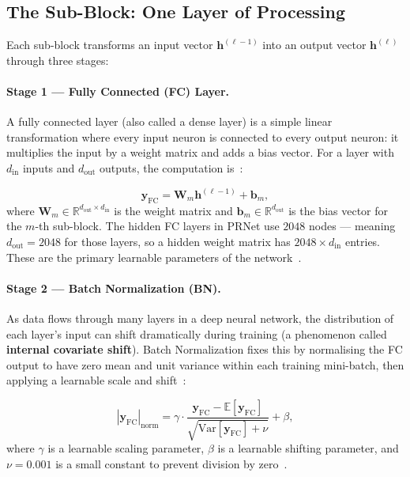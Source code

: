 \subsection{The Sub-Block: One Layer of Processing}

Each sub-block transforms an input vector $\bm{h}^{(\ell-1)}$ into an
output vector $\bm{h}^{(\ell)}$ through three stages:

\paragraph{Stage 1 --- Fully Connected (FC) Layer.}
A fully connected layer (also called a dense layer) is a simple linear
transformation where every input neuron is connected to every output neuron:
it multiplies the input by a weight matrix and adds a bias vector. For a
layer with $d_{\mathrm{in}}$ inputs and $d_{\mathrm{out}}$ outputs, the
computation is~\cite{kim2017novel}:

\begin{equation}
    \bm{y}_{\mathrm{FC}} = \bm{W}_m \bm{h}^{(\ell-1)} + \bm{b}_m,
    \label{eq:prnet_fc}
\end{equation}
where $\bm{W}_m \in \mathbb{R}^{d_{\mathrm{out}} \times d_{\mathrm{in}}}$
is the weight matrix and $\bm{b}_m \in \mathbb{R}^{d_{\mathrm{out}}}$ is
the bias vector for the $m$-th sub-block.  The hidden FC layers in PRNet use
$2048$ nodes --- meaning $d_{\mathrm{out}} = 2048$ for those layers, so a
hidden weight matrix has $2048 \times d_{\mathrm{in}}$ entries.  These are the
primary learnable parameters of the network~\cite{kim2017novel}.

\paragraph{Stage 2 --- Batch Normalization (BN).}
As data flows through many layers in a deep neural network, 
the distribution of each layer's input can shift dramatically during
training (a phenomenon called \textbf{internal covariate shift}).
Batch Normalization fixes this by normalising the FC output to have
zero mean and unit variance within each training mini-batch, then
applying a learnable scale and shift~\cite{kim2017novel}:

\begin{equation}
    |\bm{y}_{\mathrm{FC}}|_{\mathrm{norm}}
    = \gamma \cdot
    \frac{\bm{y}_{\mathrm{FC}} - \mathbb{E}[\bm{y}_{\mathrm{FC}}]}
         {\sqrt{\mathrm{Var}[\bm{y}_{\mathrm{FC}}] + \nu}}
    + \beta,
    \label{eq:prnet_batchnorm}
\end{equation}
where $\gamma$ is a learnable scaling parameter, $\beta$ is a learnable
shifting parameter, and $\nu = 0.001$ is a small constant to prevent
division by zero~\cite{kim2017novel}.

